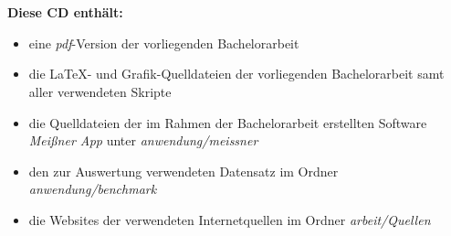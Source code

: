 \chapter*{}
\thispagestyle{empty}

\begin{center}
  \vspace{-3cm}
\end{center}

\vfill

\textbf{Diese CD enthält:}
\begin{itemize}
 \item eine \emph{pdf}-Version der vorliegenden Bachelorarbeit
 \item die \LaTeX- und Grafik-Quelldateien der vorliegenden Bachelorarbeit samt aller verwendeten Skripte
 \item die Quelldateien der im Rahmen der Bachelorarbeit erstellten Software \emph{Meißner App} unter \emph{anwendung/meissner}
 \item den zur Auswertung verwendeten Datensatz im Ordner \emph{anwendung/benchmark}
 \item die Websites der verwendeten Internetquellen im Ordner \emph{arbeit/Quellen}
\end{itemize}
